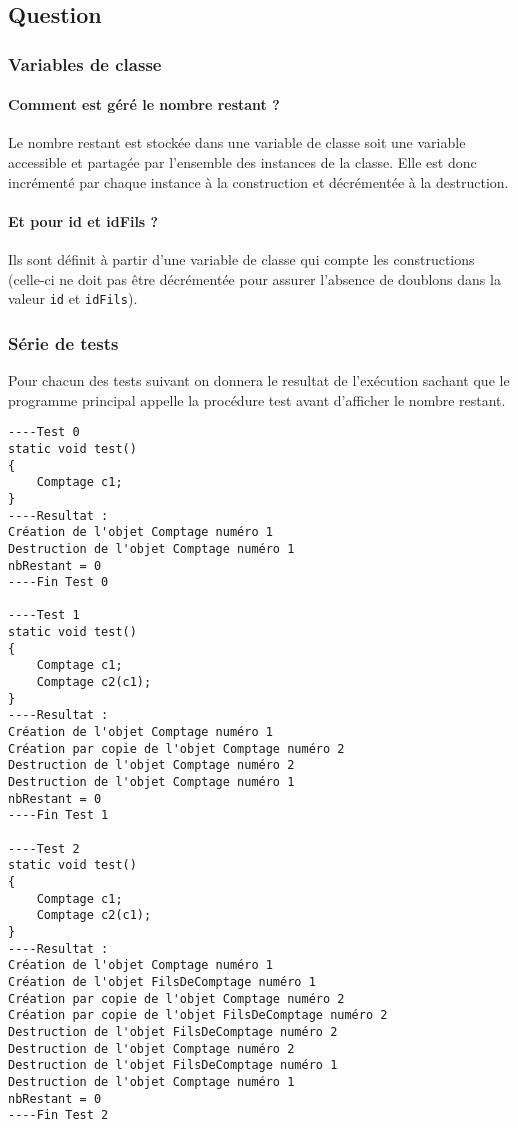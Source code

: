 \documentclass[10pt,a4paper,twoside]{article}
\begin{document}
\subsection{Question}
\subsubsection{Variables de classe}
\paragraph{Comment est géré le nombre restant ?} Le nombre restant est stockée dans une variable de classe soit une variable accessible et partagée par l’ensemble des instances de la classe. Elle est donc incrémenté par chaque instance à la construction et décrémentée à la destruction.

\paragraph{Et pour id et idFils ?} Ils sont définit à partir d'une variable de classe qui compte les constructions (celle-ci ne doit pas être décrémentée pour assurer l'absence de doublons dans la valeur \verb=id= et \verb=idFils=).

\subsubsection{Série de tests}
Pour chacun des tests suivant on donnera le resultat de l'exécution sachant que le programme principal appelle la procédure test avant d'afficher le nombre restant.
\begin{verbatim}
----Test 0
static void test()
{
    Comptage c1;
}
----Resultat :
Création de l'objet Comptage numéro 1
Destruction de l'objet Comptage numéro 1
nbRestant = 0
----Fin Test 0

----Test 1
static void test()
{
    Comptage c1;
    Comptage c2(c1);
}
----Resultat :
Création de l'objet Comptage numéro 1
Création par copie de l'objet Comptage numéro 2
Destruction de l'objet Comptage numéro 2
Destruction de l'objet Comptage numéro 1
nbRestant = 0
----Fin Test 1

----Test 2
static void test()
{
    Comptage c1;
    Comptage c2(c1);
}
----Resultat :
Création de l'objet Comptage numéro 1
Création de l'objet FilsDeComptage numéro 1
Création par copie de l'objet Comptage numéro 2
Création par copie de l'objet FilsDeComptage numéro 2
Destruction de l'objet FilsDeComptage numéro 2
Destruction de l'objet Comptage numéro 2
Destruction de l'objet FilsDeComptage numéro 1
Destruction de l'objet Comptage numéro 1
nbRestant = 0
----Fin Test 2
\end{verbatim}
\end{document}
